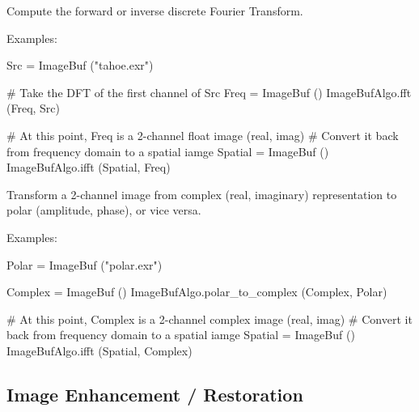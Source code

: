  
 

Compute the forward or inverse discrete Fourier Transform.

\smallskip
\noindent Examples:
\begin{code}
    Src = ImageBuf ("tahoe.exr")

    # Take the DFT of the first channel of Src
    Freq = ImageBuf ()
    ImageBufAlgo.fft (Freq, Src)

    # At this point, Freq is a 2-channel float image (real, imag)
    # Convert it back from frequency domain to a spatial iamge
    Spatial = ImageBuf ()
    ImageBufAlgo.ifft (Spatial, Freq)
\end{code}
\apiend


 
 

Transform a 2-channel image from complex (real, imaginary) representation
to polar (amplitude, phase), or vice versa.

\smallskip
\noindent Examples:
\begin{code}
    Polar = ImageBuf ("polar.exr")

    Complex = ImageBuf ()
    ImageBufAlgo.polar_to_complex (Complex, Polar)

    # At this point, Complex is a 2-channel complex image (real, imag)
    # Convert it back from frequency domain to a spatial iamge
    Spatial = ImageBuf ()
    ImageBufAlgo.ifft (Spatial, Complex)
\end{code}
\apiend



\subsection{Image Enhancement / Restoration}
\label{sec:iba:py:enhance}

 

